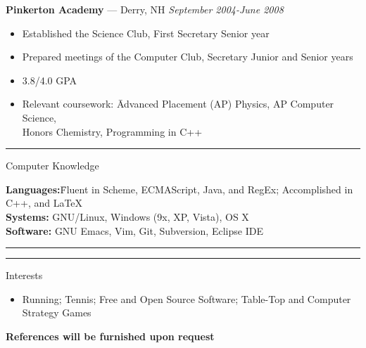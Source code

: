 \documentclass[10pt]{letter}
\begin{document}
\begin{tabbing}
{\large \bf Pinkerton Academy} --- Derry, NH \` \textit{September 2004-June 2008}
\end{tabbing}\vspace{-15pt}
\begin{itemize}
\setlength\itemsep{1pt}
\item Established the Science Club, First Secretary Senior year
\item Prepared meetings of the Computer Club, Secretary Junior and Senior years
\item 3.8/4.0 GPA
\item \begin{tabbing}Relevant coursework:\hspace{.5in} \= Advanced Placement (AP) Physics, AP Computer Science,\\
	\> Honors Chemistry, Programming in C++\end{tabbing}
\end{itemize}\vspace{-15pt}

\rule{\linewidth}{.5pt}

{\Large Computer Knowledge}
\begin{tabbing}
\textbf{Languages:}\hspace{.2in}\= Fluent in Scheme, ECMAScript,
                   Java, and RegEx; Accomplished in C++, and \LaTeX\\
\textbf{Systems:}\> GNU/Linux, Windows (9x, XP, Vista), OS X\\
\textbf{Software:}\> GNU Emacs, Vim, Git, Subversion, Eclipse IDE
\end{tabbing}\vspace{-15pt}

\rule{\linewidth}{.5pt}





\vspace{-15pt}

\rule{\linewidth}{.5pt}

{\Large Interests}\vspace{-5pt}
\begin{itemize}
\setlength\itemsep{1pt}
\item Running; Tennis; Free and Open Source Software; Table-Top and Computer Strategy Games
\end{itemize}
\begin{center}\textbf{References will be furnished upon request}\end{center}
\end{document}
